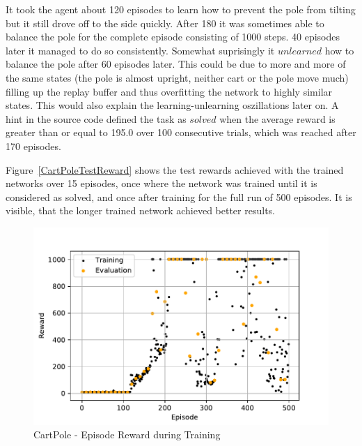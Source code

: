\documentclass[
        a4paper,
        10pt,
        parskip = full,    %
    ]{scrartcl}
\begin{document}
It took the agent about 120 episodes to learn how to prevent the pole from tilting
but it still drove off to the side quickly. After 180 it was sometimes able to
balance the pole for the complete episode consisting of 1000 steps. 40 episodes
later it managed to do so consistently. Somewhat suprisingly it $unlearned$ how to balance the pole after 60 episodes later. This could be due to more and more
of the same states (the pole is almost upright, neither cart or the pole move much)
filling up the replay buffer and thus overfitting the network to highly similar
states. This would also explain the learning-unlearning oszillations later on.
A hint in the source code defined the task as $solved$ when the average reward is
greater than or equal to 195.0 over 100 consecutive trials, which was reached
after 170 episodes.

Figure~\ref{CartPoleTestReward} shows the test rewards achieved with the trained
networks over 15 episodes, once where the network was trained until it is
considered as solved, and once after training for the full run of 500 episodes.
It is visible, that the longer trained network achieved better results.

\begin{figure}[H]
  \begin{center}
    \includegraphics{./images/CartPole-v0/tb_train_eval_reward.pdf}
    \caption{CartPole - Episode Reward during Training}
    \label{CartPoleTrainEvalReward}
  \end{center}
\end{figure}
\end{document}
